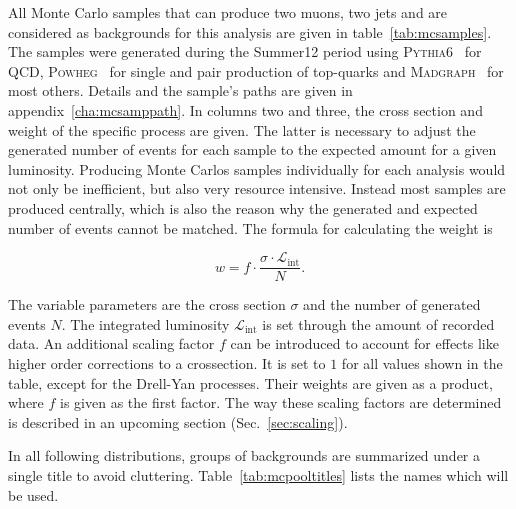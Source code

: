 All Monte Carlo samples that can produce two muons, two jets and are considered as backgrounds for this analysis are given in table~\ref{tab:mcsamples}. The samples were generated during the Summer12 period using \textsc{Pythia6}~\cite{pythia6} for QCD, \textsc{Powheg}~\cite{powheg,powhegst,powhegtt} for single and pair production of top-quarks and \textsc{Madgraph}~\cite{madgraph5} for most others. Details and the sample's paths are given in appendix~\ref{cha:mcsamppath}. In columns two and three, the cross section and weight of the specific process are given. The latter is necessary to adjust the generated number of events for each sample to the expected amount for a given luminosity. Producing Monte Carlos samples individually for each analysis would not only be inefficient, but also very resource intensive. Instead most samples are produced centrally, which is also the reason why the generated and expected number of events cannot be matched. The formula for calculating the weight is

\begin{equation}
  \label{eq:weight}
  w = f \cdot \frac{\sigma \cdot \mathcal{L}_{\text{int}}}{N}.
\end{equation}

\noindent The variable parameters are the cross section $\sigma$ and the number of generated events $N$. The integrated luminosity $\mathcal{L}_{\text{int}}$ is set through the amount of recorded data. An additional scaling factor $f$ can be introduced to account for effects like higher order corrections to a crossection. It is set to $1$ for all values shown in the table, except for the Drell-Yan processes. Their weights are given as a product, where $f$ is given as the first factor. The way these scaling factors are determined is described in an upcoming section (Sec.~\ref{sec:scaling}).

In all following distributions, groups of backgrounds are summarized under a single title to avoid cluttering. Table~\ref{tab:mcpooltitles} lists the names which will be used.

